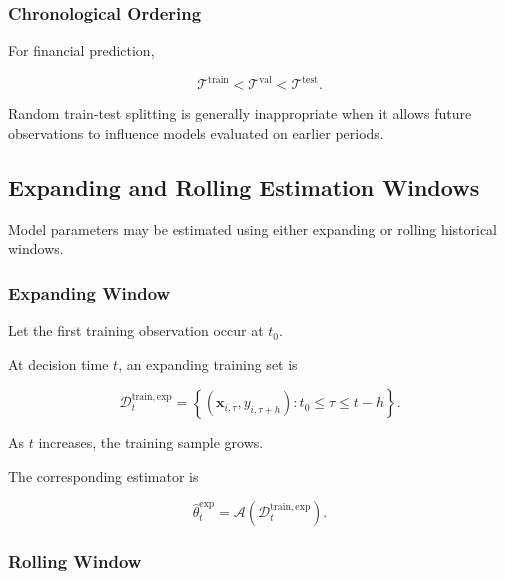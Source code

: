 \documentclass[11pt,a4paper]{article}
\begin{document}
\subsubsection{Chronological Ordering}

For financial prediction,

\begin{equation}
\boxed{
\mathcal{T}^{\mathrm{train}}
<
\mathcal{T}^{\mathrm{val}}
<
\mathcal{T}^{\mathrm{test}}.
}
\end{equation}

Random train-test splitting is generally inappropriate when it allows future
observations to influence models evaluated on earlier periods.


\subsection{Expanding and Rolling Estimation Windows}
\label{subsec:expanding_rolling_windows}

Model parameters may be estimated using either expanding or rolling historical
windows.


\subsubsection{Expanding Window}

Let the first training observation occur at $t_0$.

At decision time $t$, an expanding training set is

\begin{equation}
\boxed{
\mathcal{D}_t^{\mathrm{train,exp}}
=
\left\{
(\mathbf{x}_{i,\tau},y_{i,\tau+h})
:
t_0
\leq
\tau
\leq
t-h
\right\}.
}
\end{equation}

As $t$ increases, the training sample grows.

The corresponding estimator is

\begin{equation}
\widehat{\theta}_t^{\mathrm{exp}}
=
\mathcal{A}
\left(
\mathcal{D}_t^{\mathrm{train,exp}}
\right).
\end{equation}


\subsubsection{Rolling Window}
\end{document}
